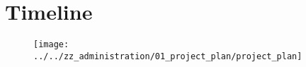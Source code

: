 \section{Timeline}
\vspace{2cm}
\begin{figure}[ht]
	\centering
	\texttt{[image: ../../zz\_administration/01\_project\_plan/project\_plan]}
\end{figure}